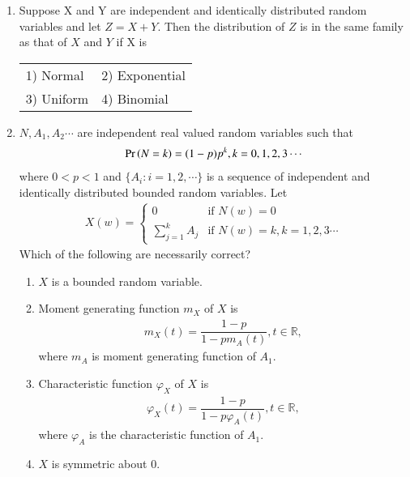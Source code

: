 \begin{enumerate}[label=\thesection.\arabic*.,ref=\thesection.\theenumi]
\item Suppose X and Y are independent and identically distributed random variables and let $Z = X + Y$. Then the distribution of $Z$ is in the same family as that of $X$ and $Y$ if X is
\begin{table}[h]
\setlength{\tabcolsep}{30pt}
    \begin{tabular}{ll}
         1) Normal  & 2) Exponential  \\
         3) Uniform & 4) Binomial
    \end{tabular}
\end{table}
%
\solution

\item  $N,A_1,A_2\cdots$ are independent real valued random variables such that 
    \begin{align}
        \Pr\left(N=k\right)=(1-p)p^k,k=0,1,2,3\cdots
    \end{align}
    where $0<p<1$ and $\{A_i:i=1,2,\cdots\}$ is a sequence of independent and identically distributed bounded random variables. Let 
    \begin{align}
        X(w) = 
        \begin{cases}
        0  & \text{if } N(w)=0\\
        \sum_{j=1}^{k} A_j & \text{if } N(w)=k,k=1,2,3\cdots 
        \end{cases}
    \end{align}
    Which of the following are necessarily correct?\\
    \begin{enumerate}
        \item $X$ is a bounded random variable. 
        \item Moment generating function $m_X$ of $X$ is
        \begin{align}
            m_X(t)=\dfrac{1-p}{1-pm_A(t)}, t\in \mathbb{R},
        \end{align}
        where $m_A$ is moment generating function of $A_1$.
        \item Characteristic function $\varphi_X$ of $X$ is
        \begin{align}
            \varphi_X(t)=\dfrac{1-p}{1-p\varphi_A(t)},t\in \mathbb{R},
        \end{align}
        where $\varphi_A$ is the characteristic function of $A_1$.
        \item $X$ is symmetric about 0.
    \end{enumerate}

\end{enumerate}